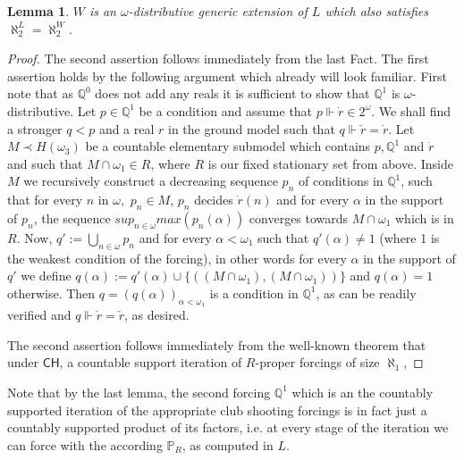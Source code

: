 \documentclass[a4paper,12pt]{article}
\newtheorem{lemma}[theorem]{Lemma}
\newcommand{\forceP}{\mathbb{P}}
\newcommand{\forceQ}{\mathbb{Q}}
\newcommand{\CH}{\mathsf{CH}}
\begin{document}
\begin{lemma}
$W$ is an $\omega$-distributive generic extension of $L$ which also satisfies $\aleph_2^L=\aleph_2^W$.
\end{lemma}
\begin{proof}
The second assertion follows immediately from the last Fact. The first assertion holds by the following argument which already will look familiar. First note that as $\forceQ^0$ does not add any reals it is sufficient to show that $\forceQ^1$ is $\omega$-distributive.
Let $p \in \forceQ^1$ be a condition and assume that $p \Vdash \dot{r} \in 2^{\omega}$. We shall find a stronger $q < p$ and a real $r$ in the ground model such that $q \Vdash \check{r}=\dot{r}$. Let $M \prec H(\omega_3)$ be a countable elementary submodel which contains $p, \forceQ^1$ and $\dot{r}$ and such that $M \cap \omega_1 \in R$, where $R$ is our fixed stationary set from above. Inside $M$ we recursively construct a decreasing sequence $p_n$ of conditions in $\forceQ^1$, such that for every $n$ in $\omega,$ $p_n \in M$, $p_n$ decides $\dot{r}(n)$ and for every $\alpha$ in the support of $p_n$, the sequence $sup_{n \in \omega} max( p_n(\alpha))$ converges towards $M \cap \omega_1$ which is in $R$. Now, $q':= \bigcup_{n \in \omega} p_n$ and for every $\alpha< \omega_1$ such that $q'(\alpha)\ne 1$ (where 1 is the weakest condition of the forcing),  in other words for every $\alpha$ in the support of $q'$ we define $q(\alpha):= q'(\alpha) \cup \{((M \cap \omega_1), (M \cap \omega_1))\}$ and $q(\alpha)=1$ otherwise. Then $q=(q(\alpha))_{\alpha < \omega_1}$ is a condition in $\forceQ^1$, as can be readily verified and $q \Vdash \dot{r} = \check{r}$, as desired.

The second assertion follows immediately from the well-known theorem that under $\CH$, a countable support iteration of $R$-proper forcings of size $\aleph_1$,
\end{proof}
Note that by the last lemma, the second forcing $\forceQ^1$ which is an the countably supported iteration of the appropriate club shooting forcings is in fact just a countably supported product of its factors, i.e. at every stage of the iteration we can force with the according $\forceP_R$, as computed in $L$.
\end{document}
